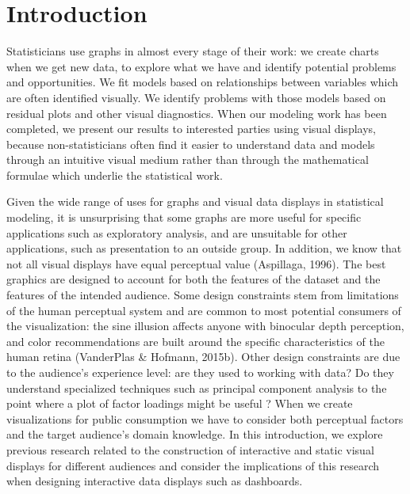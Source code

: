 \documentclass[print]{nuthesis}
\begin{document}
\hypertarget{introduction}{%
\chapter{Introduction}\label{introduction}}

Statisticians use graphs in almost every stage of their work: we create charts when we get new data, to explore what we have and identify potential problems and opportunities.
We fit models based on relationships between variables which are often identified visually.
We identify problems with those models based on residual plots and other visual diagnostics.
When our modeling work has been completed, we present our results to interested parties using visual displays, because non-statisticians often find it easier to understand data and models through an intuitive visual medium rather than through the mathematical formulae which underlie the statistical work.

Given the wide range of uses for graphs and visual data displays in statistical modeling, it is unsurprising that some graphs are more useful for specific applications such as exploratory analysis, and are unsuitable for other applications, such as presentation to an outside group.
In addition, we know that not all visual displays have equal perceptual value (Aspillaga, 1996).
The best graphics are designed to account for both the features of the dataset and the features of the intended audience.
Some design constraints stem from limitations of the human perceptual system and are common to most potential consumers of the visualization: the sine illusion affects anyone with binocular depth perception, and color recommendations are built around the specific characteristics of the human retina (VanderPlas \& Hofmann, 2015b).
Other design constraints are due to the audience's experience level: are they used to working with data?
Do they understand specialized techniques such as principal component analysis to the point where a plot of factor loadings might be  useful ?
When we create visualizations for public consumption we have to consider both perceptual factors and the target audience's domain knowledge.
In this introduction, we explore previous research related to the construction of interactive and static visual displays for different audiences and consider the implications of this research when designing interactive data displays such as dashboards.

\end{document}

